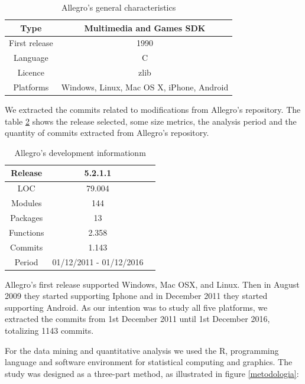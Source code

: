 \documentclass[10pt, conference]{IEEEtran}
\begin{document}
\begin{table}[h]
\renewcommand{\arraystretch}{1.3}
\caption{Allegro’s general characteristics}
\label{allegrogeneral}
\centering

\begin{tabular}{|c|c|}
\hline
Type & Multimedia and Games SDK \\
\hline
First release & 1990 \\
\hline
Language & C \\
\hline
Licence & zlib \\
\hline
Platforms & Windows, Linux, Mac OS X, iPhone, Android \\
\hline
\end{tabular}
\end{table}

We extracted the commits related to modifications from Allegro's repository. The table \ref{allegroinfo} shows the release selected, some size metrics, the analysis period  and the quantity of commits extracted from Allegro's repository.  

\begin{table}[h]
\renewcommand{\arraystretch}{1.3}
\caption{Allegro’s development informationm}
\label{allegroinfo}
\centering
\begin{tabular}{|c|c|c|}
\hline
Release & 5.2.1.1\\
\hline
LOC & 79.004 \\
\hline
Modules & 144\\
\hline
Packages & 13\\
\hline
Functions & 2.358\\
\hline
Commits & 1.143  \\
\hline
Period & 01/12/2011 - 01/12/2016   \\
\hline
\end{tabular}
\end{table}


Allegro's first release supported Windows, Mac OSX, and Linux. Then in August 2009 they started supporting Iphone and in December 2011 they started supporting Android. As our intention was to study all five platforms, we extracted the commits from 1st December 2011 until 1st December 2016, totalizing 1143 commits.  

For the data mining and quantitative analysis we used the R, programming language and software environment for statistical computing and graphics. The study was designed as a three-part method, as illustrated in figure \ref{metodologia}: 
\end{document}
